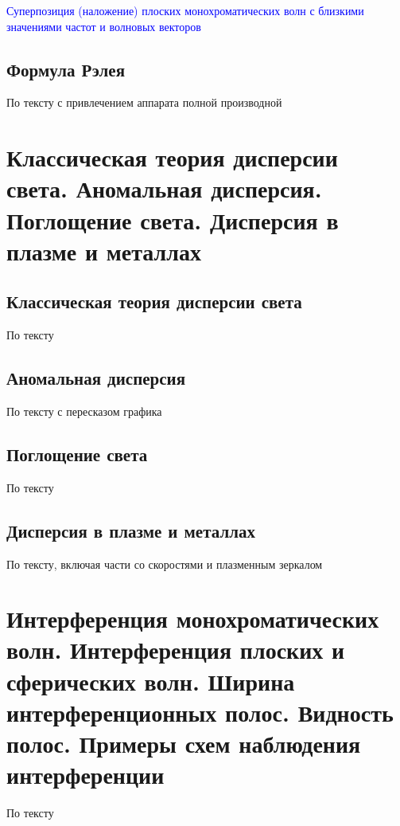 \documentclass[a4paper, 14pt]{article}
\begin{document}
    \textcolor{blue}{Суперпозиция (наложение) плоских монохроматических волн с близкими значениями частот и волновых
    векторов}
    
    \subsection{Формула Рэлея}
    
    По тексту с привлечением аппарата полной производной
    
    \section{Классическая теория дисперсии света.
    Аномальная дисперсия.
    Поглощение света.
    Дисперсия в плазме и металлах}
    
    \subsection{Классическая теория дисперсии света}
    
    По тексту
    
    \subsection{Аномальная дисперсия}
    
    По тексту с пересказом графика
    
    \subsection{Поглощение света}
    
    По тексту
    
    \subsection{Дисперсия в плазме и металлах}
    
    По тексту, включая части со скоростями и плазменным зеркалом
    
    \section{Интерференция монохроматических волн.
    Интерференция плоских и сферических волн.
    Ширина интерференционных полос.
    Видность полос.
    Примеры схем наблюдения интерференции}
   
    По тексту
    
\end{document}
